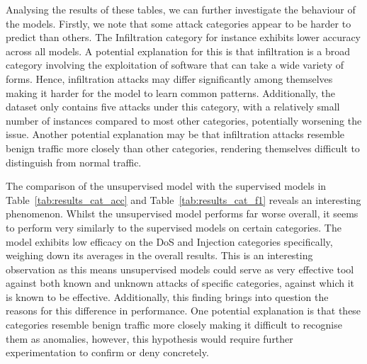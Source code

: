 Analysing the results of these tables, we can further investigate the behaviour
of the models. Firstly, we note that some attack categories appear to be harder
to predict than others. The Infiltration category for instance exhibits lower
accuracy across all models. A potential explanation for this is that
infiltration is a broad category involving the exploitation of software that
can take a wide variety of forms. Hence, infiltration attacks may differ
significantly among themselves making it harder for the model to learn common
patterns. Additionally, the dataset only contains five attacks under this
category, with a relatively small number of instances compared to most other
categories, potentially worsening the issue. Another potential explanation may
be that infiltration attacks resemble benign traffic more closely than other
categories, rendering themselves difficult to distinguish from normal traffic.

The comparison of the unsupervised model with the supervised models in
Table~\ref{tab:results_cat_acc} and Table~\ref{tab:results_cat_f1} reveals an
interesting phenomenon. Whilst the unsupervised model performs far worse
overall, it seems to perform very similarly to the supervised models on certain
categories. The model exhibits low efficacy on the DoS and Injection categories
specifically, weighing down its averages in the overall results. This is an
interesting observation as this means unsupervised models could serve as very
effective tool against both known and unknown attacks of specific categories,
against which it is known to be effective. Additionally, this finding brings
into question the reasons for this difference in performance. One potential
explanation is that these categories resemble benign traffic more closely
making it difficult to recognise them as anomalies, however, this hypothesis
would require further experimentation to confirm or deny concretely.

